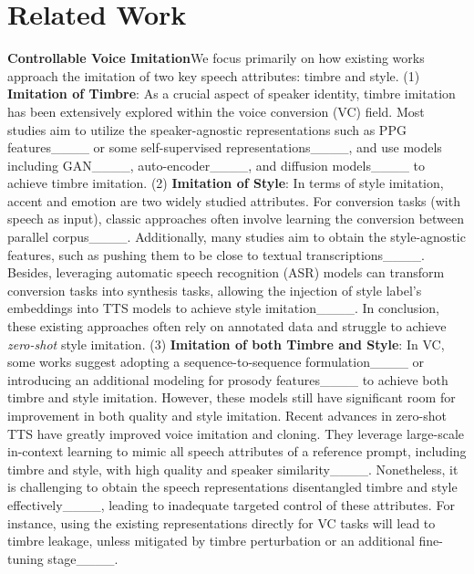 \section{Related Work}
\textbf{Controllable Voice Imitation}\quad We focus primarily on how existing works approach the imitation of two key speech attributes: timbre and style. (1) \textbf{Imitation of Timbre}: As a crucial aspect of speaker identity, timbre imitation has been extensively explored within the voice conversion (VC) field. Most studies aim to utilize the speaker-agnostic representations such as PPG features____ or some self-supervised representations____, and use models including GAN____, auto-encoder____, and diffusion models____ to achieve timbre imitation. (2) \textbf{Imitation of Style}: In terms of style imitation, accent and emotion are two widely studied attributes. For conversion tasks (with speech as input), classic approaches often involve learning the conversion between parallel corpus____. Additionally, many studies aim to obtain the style-agnostic features, such as pushing them to be close to textual transcriptions____. Besides, leveraging automatic speech recognition (ASR) models can transform conversion tasks into synthesis tasks, allowing the injection of style label's embeddings into TTS models to achieve style imitation____. In conclusion, these existing approaches often rely on annotated data and struggle to achieve \textit{zero-shot} style imitation. (3) \textbf{Imitation of both Timbre and Style}: In VC, some works suggest adopting a sequence-to-sequence formulation____ or introducing an additional modeling for prosody features____ to achieve both timbre and style imitation. However, these models still have significant room for improvement in both quality and style imitation. Recent advances in zero-shot TTS have greatly improved voice imitation and cloning. They leverage large-scale in-context learning to mimic all speech attributes of a reference prompt, including timbre and style, with high quality and speaker similarity____. Nonetheless, it is challenging to obtain the speech representations disentangled timbre and style effectively____, leading to inadequate targeted control of these attributes. For instance, using the existing representations directly for VC tasks will lead to timbre leakage, unless mitigated by timbre perturbation or an additional fine-tuning stage____.


